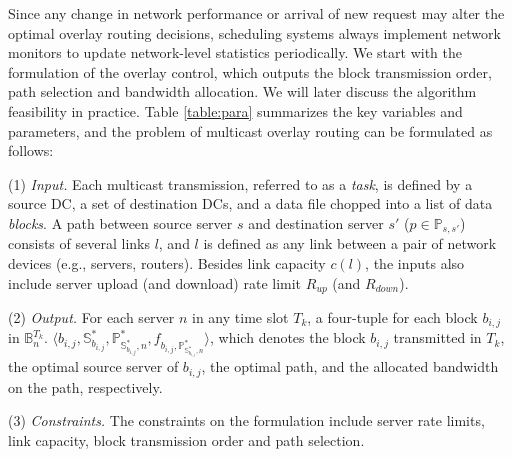 Since any change in network performance or arrival of
new request may alter the optimal overlay
routing decisions, scheduling systems always implement network monitors to update network-level statistics periodically. We start with the formulation of the overlay control, which outputs the block transmission order, path selection and bandwidth allocation. We will later discuss the algorithm feasibility in practice.
Table \ref{table:para} summarizes the key variables and parameters, and the problem of multicast overlay routing can be formulated as follows:


\noindent(1) {\em Input.} %
Each multicast transmission, referred to as a {\em task}, is defined
by a source DC, a set of destination DCs, and a data file chopped into
a list of data {\em blocks}.
A path between source server $s$ and destination server $s'$ ($p\in \mathbb{P}_{s,s'}$) consists of several links $l$, and $l$ is defined as any link between a pair of network devices (e.g., servers, routers).
Besides link capacity $c(l)$, the inputs also include
server upload (and download) rate limit $R_{up}$ (and $R_{down}$).

\noindent(2) {\em Output.} For each server $n$ in any time slot $T_k$, a four-tuple for each block $b_{i,j}$ in $\mathbb{B}_n^{T_k}$. $\langle b_{i,j}, \mathbb{S}^*_{b_{i,j}}, \mathbb{P}^*_{\mathbb{S}^*_{b_{i,j}},n}, f_{b_{i,j},\mathbb{P}^*_{\mathbb{S}^*_{b_{i,j}},n}} \rangle$, which denotes the block $b_{i,j}$ transmitted in $T_k$, the optimal source server of $b_{i,j}$, the optimal path, and the allocated bandwidth on the path, respectively.

\noindent(3) {\em Constraints.}
The constraints on the formulation include server rate limits, link capacity, block transmission order and path selection.

